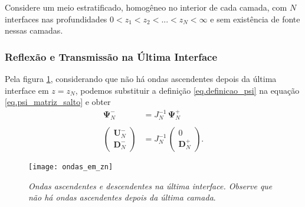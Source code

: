 Considere um meio estratificado, homog\^eneo no interior de cada camada, com $N$ interfaces nas profundidades $0<z_1<z_2<...<z_N<\infty$ e sem exist\^encia de fonte nessas camadas. 

\subsubsection{Reflex\~ao e Transmiss\~ao na \'Ultima Interface}
Pela figura \ref{fig.ondas_em_zn}, considerando que n\~ao h\'a ondas ascendentes depois da \'ultima interface em $z=z_N$, podemos substituir a defini\c{c}\~ao \ref{eq.definicao_psi} na equa\c{c}\~ao \ref{eq.psi_matriz_salto} e obter
\begin{align*}
\mathbf{\Psi}_N^-&=J_N^{-1}\,\mathbf{\Psi}_N^+\\\\
\begin{pmatrix}
\mathbf{U}_N^-\\
\mathbf{D}_N^-
\end{pmatrix}
&=J_N^{-1}\,
\begin{pmatrix}
0\\
\mathbf{D}_N^+
\end{pmatrix}.
\end{align*}

\begin{figure}
\centering
\texttt{[image: ondas\_em\_zn]}
\caption{\textit{Ondas ascendentes e descendentes na \'ultima interface. Observe que n\~ao h\'a ondas ascendentes depois da \'ultima camada}.}
\label{fig.ondas_em_zn}
\end{figure}

